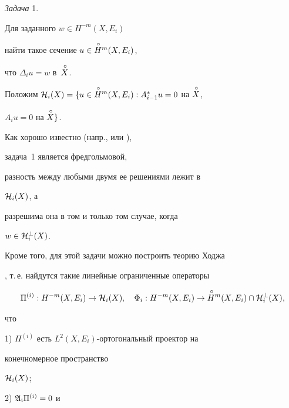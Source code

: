 \medskip





{\it Задача} 1.




Для заданного $w \in H^{-m} (X,E_i)$


найти такое сечение $u \in \overset{\,\circ}{H}{}{}^{m} (X,E_i)$,


что $\Delta_i u=w $ в~$\overset{\,\circ}{X}{}$.


\medskip





Положим ${\cal H}_i (X)


= \{u \in \i{H}{}^m (X,E_i): A^*_{i-1} u=0$ на $\i{X}$,


$A_i u=0$ на $\overset{\,\circ}{X}{}\}$.





Как хорошо известно (напр., \cite{VishX} или \cite{SchShTa2}),


задача~1 является фредгольмовой,


разность между любыми двумя ее решениями лежит в


${\cal H}_i (X)$, а


разрешима она в том и только том случае, когда


$w \in {\cal H}_i ^{\perp} (X)$.





Кроме того, для этой задачи можно построить теорию Ходжа


\cite{SchShTa2}, т.\,е. найдутся такие линейные ограниченные операторы


$$


\Pi ^{(i)} :H^{-m} (X,E_i) \to


{\cal H}_i (X), \quad


{\Phi}_i :H^{-m} (X,E_i)\to


\i{H}{}^{m} (X,E_i) \cap {\cal H}_i ^{\perp} (X),


$$


что





1) $\Pi ^{(i)}$ есть $L^{2} (X,E_i)$-ортогональный проектор на


конечномерное пространство


${\cal H}_i (X)$;





2) $\frak{A_i} \Pi^{(i)}=0$ и


